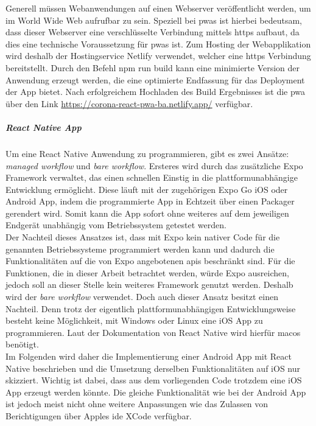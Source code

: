 Generell müssen Webanwendungen auf einen Webserver veröffentlicht werden, um im World Wide Web aufrufbar zu sein.
Speziell bei \acp{pwa} ist hierbei bedeutsam, dass dieser Webserver eine verschlüsselte Verbindung mittels \ac{https} aufbaut, da dies eine technische Voraussetzung für \acp{pwa} ist.
Zum Hosting der Webapplikation wird deshalb der Hostingservice Netlify verwendet, welcher eine \ac{https} Verbindung bereitstellt.
Durch den Befehl \glqq npm run build\grqq{} kann eine minimierte Version der Anwendung erzeugt werden, die eine optimierte Endfassung für das Deployment der App bietet.
Nach erfolgreichem Hochladen des Build Ergebnisses ist die \ac{pwa} über den Link \url{https://corona-react-pwa-ba.netlify.app/} verfügbar.

\subparagraph{React Native App\\}
Um eine React Native Anwendung zu programmieren, gibt es zwei Ansätze: \textit{managed workflow} und \textit{bare workflow}.
Ersteres wird durch das zusätzliche Expo Framework verwaltet, das einen schnellen Einstig in die plattformunabhängige Entwicklung ermöglicht.
Diese läuft mit der zugehörigen Expo Go iOS oder Android App, indem die programmierte App in Echtzeit über einen Packager gerendert wird.
Somit kann die App sofort ohne weiteres auf dem jeweiligen Endgerät unabhängig vom Betriebssystem getestet werden.\\
Der Nachteil dieses Ansatzes ist, dass mit Expo kein nativer Code für die genannten Betriebssysteme programmiert werden kann und dadurch die Funktionalitäten auf die von Expo angebotenen \ac{api}s beschränkt sind.
Für die Funktionen, die in dieser Arbeit betrachtet werden, würde Expo ausreichen, jedoch soll an dieser Stelle kein weiteres Framework genutzt werden.
Deshalb wird der \textit{bare workflow} verwendet.
Doch auch dieser Ansatz besitzt einen Nachteil.
Denn trotz der eigentlich plattformunabhängigen Entwicklungsweise besteht keine Möglichkeit, mit Windows oder Linux eine iOS App zu programmieren.
Laut der Dokumentation von React Native wird hierfür mac\ac{os} benötigt.\\
Im Folgenden wird daher die Implementierung einer Android App mit React Native beschrieben und die Umsetzung derselben Funktionalitäten auf iOS nur skizziert.
Wichtig ist dabei, dass aus dem vorliegenden Code trotzdem eine iOS App erzeugt werden könnte.
Die gleiche Funktionalität wie bei der Android App ist jedoch meist nicht ohne weitere Anpassungen wie das Zulassen von Berichtigungen über Apples \ac{ide} XCode verfügbar.

